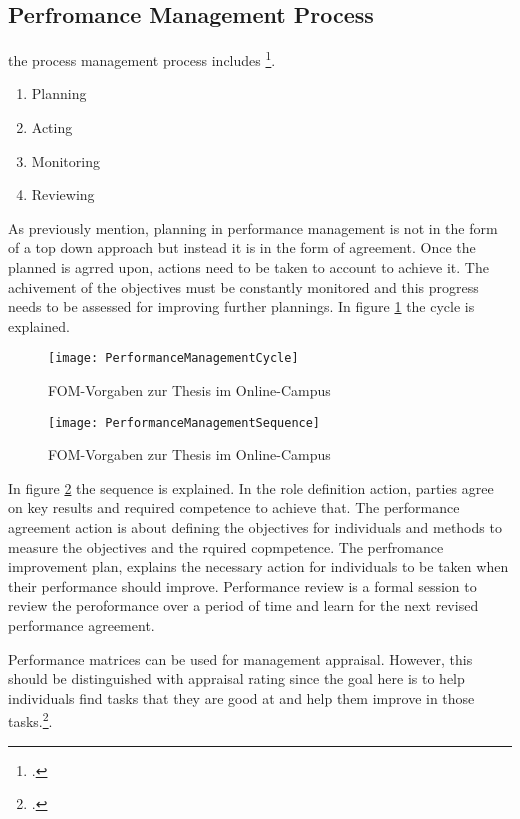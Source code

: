 \subsection{Perfromance Management Process}
the process management process includes \footcite[See.][]{Armstrong2006}. 
\begin{enumerate}
\item Planning
\item Acting
\item Monitoring
\item Reviewing
\end{enumerate}
As previously mention, planning in performance management is not in the form of a top down approach but instead it is in the form of agreement. Once the planned is agrred upon, actions need to be taken to account to achieve it. The achivement of the objectives must be constantly monitored and this progress needs to be assessed for improving further plannings.
In figure \ref{fig:PerformanceManagementCycle} the cycle is explained.
\begin{figure}
\caption{FOM-Vorgaben zur Thesis im Online-Campus}
\label{fig:PerformanceManagementCycle}
\texttt{[image: PerformanceManagementCycle]}
\cite[Source: See.][]{Armstrong2006}
\end{figure}

\begin{figure}
\caption{FOM-Vorgaben zur Thesis im Online-Campus}
\label{fig:PerformanceManagementSequence}
\texttt{[image: PerformanceManagementSequence]}
\cite[Source: See.][]{Armstrong2006}
\end{figure}

In figure \ref{fig:PerformanceManagementSequence} the sequence is explained. In the role definition action, parties agree on key results and required competence to achieve that. The performance agreement action is about defining the objectives for individuals and methods to measure the objectives and the rquired copmpetence. The perfromance improvement plan, explains the necessary action for individuals to be taken when their performance should improve. Performance review is a formal session to review the peroformance over a period of time and learn for the next revised performance agreement.

Performance matrices can be used for management appraisal. However, this should be distinguished with appraisal rating since the goal here is to help individuals find tasks that they are good at and help them improve in those tasks.\footcite[See.][]{Armstrong2006}. 

